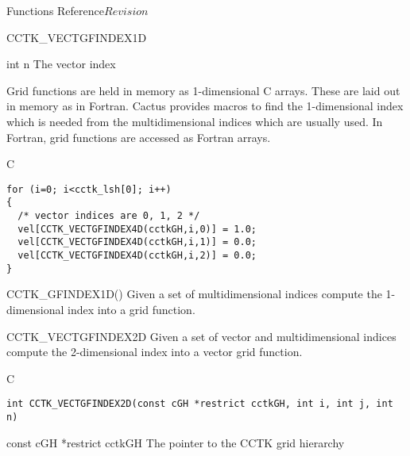 \begin{cactuspart}{ Functions Reference}{}{$Revision$}
\begin{FunctionDescription}{CCTK\_VECTGFINDEX1D}
\begin{ParameterSection}
\begin{Parameter} {int n}
The vector index
\end{Parameter}
\end{ParameterSection}

\begin{Discussion}
Grid functions are held in memory as 1-dimensional C arrays. These are
laid out in memory as in Fortran. Cactus provides macros to find the
1-dimensional index which is needed from the multidimensional indices which
are usually used. In Fortran, grid functions are accessed as Fortran arrays.
\end{Discussion}
\begin{ExampleSection}
\begin{Example}{C}
\begin{verbatim}
for (i=0; i<cctk_lsh[0]; i++)
{
  /* vector indices are 0, 1, 2 */
  vel[CCTK_VECTGFINDEX4D(cctkGH,i,0)] = 1.0;
  vel[CCTK_VECTGFINDEX4D(cctkGH,i,1)] = 0.0;
  vel[CCTK_VECTGFINDEX4D(cctkGH,i,2)] = 0.0;
}
\end{verbatim}
\end{Example}
\end{ExampleSection}
\begin{SeeAlsoSection}
\begin{SeeAlso}{CCTK\_GFINDEX1D()}
Given a set of multidimensional indices compute the 1-dimensional index into a
grid function.
\end{SeeAlso}

\end{SeeAlsoSection}
\end{FunctionDescription}



\begin{FunctionDescription}{CCTK\_VECTGFINDEX2D}
\label{CCTK-VECTGFINDEX2D}
Given a set of vector and multidimensional indices compute the 2-dimensional
index into a vector grid function.
\begin{SynopsisSection}
\begin{Synopsis}{C}
\begin{verbatim}
int CCTK_VECTGFINDEX2D(const cGH *restrict cctkGH, int i, int j, int n)
\end{verbatim}
\end{Synopsis}
\end{SynopsisSection}

\begin{ParameterSection}
\begin{Parameter} {const cGH *restrict cctkGH}
The pointer to the CCTK grid hierarchy
\end{Parameter}


\end{ParameterSection}
\end{FunctionDescription}
\end{cactuspart}

